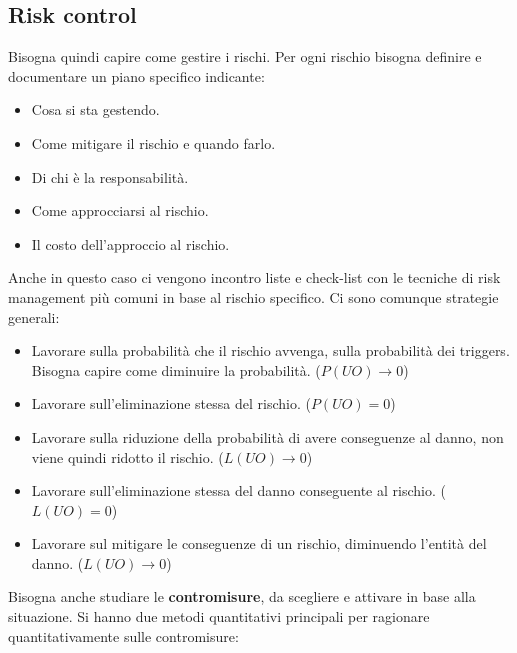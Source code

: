 \subsection{Risk control}
Bisogna quindi capire come gestire i rischi. Per ogni rischio bisogna definire e
documentare un piano specifico indicante:
\begin{itemize}
    \item Cosa si sta gestendo.
    \item Come mitigare il rischio e quando farlo.
    \item Di chi è la responsabilità.
    \item Come approcciarsi al rischio.
    \item Il costo dell'approccio al rischio.
\end{itemize}
Anche in questo caso ci vengono incontro liste e check-list con le tecniche di risk
management più comuni in base al rischio specifico. Ci sono comunque strategie generali:
\begin{itemize}
    \item Lavorare sulla probabilità che il rischio avvenga, sulla probabilità dei
          triggers. Bisogna capire come diminuire la probabilità. ($P(UO)\rightarrow 0$)
    \item Lavorare sull'eliminazione stessa del rischio. ($P(UO)= 0$)
    \item Lavorare sulla riduzione della probabilità di avere conseguenze al danno,
          non viene quindi ridotto il rischio. ($L(UO)\rightarrow 0$)
    \item Lavorare sull'eliminazione stessa del danno conseguente al rischio. ($L(UO)= 0$)
    \item Lavorare sul mitigare le conseguenze di un rischio, diminuendo l'entità
          del danno. ($L(UO)\rightarrow 0$)
\end{itemize}
Bisogna anche studiare le \textbf{contromisure}, da scegliere e attivare in base
alla situazione. Si hanno due metodi quantitativi principali per ragionare
quantitativamente sulle contromisure:
